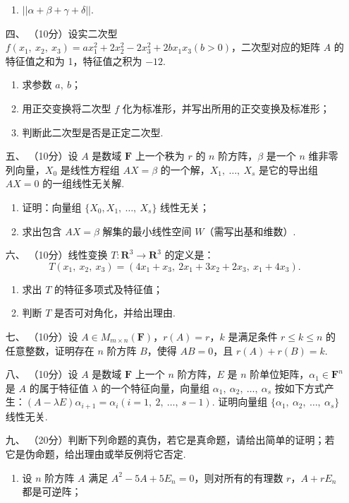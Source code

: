 \begin{enumerate}
\begin{enumerate}[label=(\arabic*)]
        \item $||\alpha+\beta+\gamma+\delta||$.
    \end{enumerate}
	\item[四、]（10分）设实二次型 $f(x_1,\ x_2,\ x_3)=ax_1^2+2x_2^2-2x_3^2+2bx_1x_3(b > 0)$，二次型对应的矩阵 $A$ 的特征值之和为 1，特征值之积为 $-12$.
    \begin{enumerate}[label=(\arabic*)]
        \item 求参数 $a,\ b$；

        \item 用正交变换将二次型 $f$ 化为标准形，并写出所用的正交变换及标准形；

        \item 判断此二次型是否是正定二次型.
    \end{enumerate}
	\item[五、]（10分）设 $A$ 是数域 $\mathbf{F}$ 上一个秩为 $r$ 的 $n$ 阶方阵，$\beta$ 是一个 $n$ 维非零列向量，$X_0$ 是线性方程组 $AX=\beta$ 的一个解，$X_1,\ \dots,\ X_s$ 是它的导出组 $AX=0$ 的一组线性无关解.
    \begin{enumerate}
        \item 证明：向量组 $\{X_0, X_1,\ \dots,\ X_s\}$ 线性无关；

        \item 求出包含 $AX=\beta$ 解集的最小线性空间 $W$（需写出基和维数）.
    \end{enumerate}
	\item[六、]（10分）线性变换 $T : \mathbf{R}^3 \to \mathbf{R}^3$ 的定义是：
    \[T(x_1,\ x_2,\ x_3)=(4x_1+x_3,\ 2x_1+3x_2+2x_3,\ x_1+4x_3).\]
    \begin{enumerate}[label=(\arabic*)]
        \item 求出 $T$ 的特征多项式及特征值；

        \item 判断 $T$ 是否可对角化，并给出理由.
    \end{enumerate}
	\item[七、]（10分）设 $A \in M_{m \times n}(\mathbf{F})$，$r(A)=r$，$k$ 是满足条件 $r \leq k \leq n$ 的任意整数，证明存在 $n$ 阶方阵 $B$，使得 $AB=0$，且 $r(A)+r(B)=k$.

    \item[八、]（10分）设 $A$ 是数域 $\mathbf{F}$ 上一个 $n$ 阶方阵，$E$ 是 $n$ 阶单位矩阵，$\alpha_1 \in \mathbf{F}^n$ 是 $A$ 的属于特征值 $\lambda$ 的一个特征向量，向量组 $\alpha_1,\ \alpha_2,\ \dots,\ \alpha_s$ 按如下方式产生：$(A-\lambda E)\alpha_{i+1}=\alpha_i(i=1,\ 2,\ \dots,\ s-1)$. 证明向量组 $\{\alpha_1,\ \alpha_2,\ \dots,\ \alpha_s\}$ 线性无关.
	\item[九、]（20分）判断下列命题的真伪，若它是真命题，请给出简单的证明；若它是伪命题，给出理由或举反例将它否定.
    \begin{enumerate}[label=(\arabic*)]
        \item 设 $n$ 阶方阵 $A$ 满足 $A^2-5A+5E_n=0$，则对所有的有理数 $r$，$A+rE_n$ 都是可逆阵；


\end{enumerate}
\end{enumerate}
